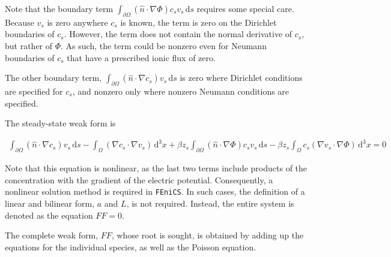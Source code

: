 Note that the boundary term
$\int_{\partial\Omega} \left( \hat{n} \cdot \nabla \Phi \right) c_s v_s \,\mathrm{d}s$
requires some special care.
Because $v_s$ is zero anywhere $c_s$ is known,
the term is zero on the Dirichlet boundaries of $c_s$.
However, the term does not contain the normal derivative of $c_s$,
but rather of $\Phi$.
As such, the term could be nonzero even for Neumann boundaries of $c_s$
that have a prescribed ionic flux of zero.

The other boundary term, $\int_{\partial\Omega} \left( \hat{n} \cdot \nabla c_s \right) v_s \,\mathrm{d}s$
is zero where Dirichlet conditions are specified for $c_s$,
and nonzero only where nonzero Neumann conditions are specified.

The steady-state weak form is

\begin{equation}
  \boxed{
    \begin{aligned}
      \int_{\partial\Omega} \left( \hat{n} \cdot \nabla c_s \right) v_s \,\mathrm{d}s
      - \int_\Omega \left( \nabla c_s \cdot \nabla v_s \right) \,\mathrm{d}^3x 
      + \beta z_s \int_{\partial\Omega} \left( \hat{n} \cdot \nabla \Phi \right) c_s v_s \,\mathrm{d}s
      - \beta z_s \int_\Omega c_s  \left( \nabla v_s \cdot \nabla \Phi \right) \,\mathrm{d}^3x
       = 0
    \end{aligned}
  }
\end{equation}

Note that this equation is nonlinear, as the last two terms include products of the concentration
with the gradient of the electric potential.
Consequently, a nonlinear solution method is required in \texttt{FEniCS}.
In such cases, the definition of a linear and bilinear form, $a$ and $L$,
is not required.
Instead, the entire system is denoted as the equation $FF = 0$.

The complete weak form, $FF$, whose root is sought, is obtained by adding up the equations for the individual species,
as well as the Poisson equation.

